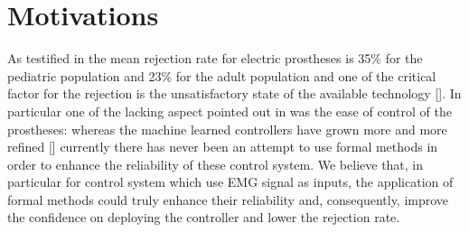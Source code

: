 \section{Motivations}
As testified in \cite{biddiss2007upper} the mean rejection rate for electric prostheses is 35\% for the pediatric population and 23\% for the adult population and one of the critical factor for the rejection is the unsatisfactory state of the available technology [\cite{biddiss2007upperfact}]. In particular one of the lacking aspect pointed out in \cite{biddiss2007upperfact} was the ease of control of the prostheses: whereas the machine learned controllers have grown more and more refined [\cite{Strazzulla2017}] currently there has never been an attempt to use formal methods in order to enhance the reliability of these control system. We believe that, in particular for control system which use EMG signal as inputs, the application of formal methods could truly enhance their reliability and, consequently, improve the confidence on deploying the controller and lower the rejection rate.